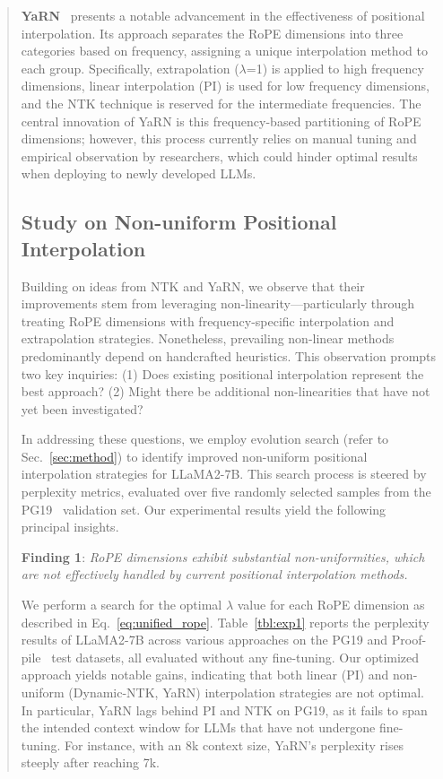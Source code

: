 \begin{abstract}
\textbf{YaRN}~\cite{yarn} presents a notable advancement in the effectiveness of positional interpolation. Its approach separates the RoPE dimensions into three categories based on frequency, assigning a unique interpolation method to each group. Specifically, extrapolation ($\lambda$=1) is applied to high frequency dimensions, linear interpolation (PI) is used for low frequency dimensions, and the NTK technique is reserved for the intermediate frequencies. The central innovation of YaRN is this frequency-based partitioning of RoPE dimensions; however, this process currently relies on manual tuning and empirical observation by researchers, which could hinder optimal results when deploying to newly developed LLMs.

\subsection{Study on Non-uniform Positional Interpolation}

Building on ideas from NTK and YaRN, we observe that their improvements stem from leveraging non-linearity—particularly through treating RoPE dimensions with frequency-specific interpolation and extrapolation strategies. Nonetheless, prevailing non-linear methods predominantly depend on handcrafted heuristics. This observation prompts two key inquiries: (1) Does existing positional interpolation represent the best approach? (2) Might there be additional non-linearities that have not yet been investigated?

In addressing these questions, we employ evolution search (refer to Sec.~\ref{sec:method}) to identify improved non-uniform positional interpolation strategies for LLaMA2-7B. This search process is steered by perplexity metrics, evaluated over five randomly selected samples from the PG19~\cite{pg19} validation set. Our experimental results yield the following principal insights.

\textbf{Finding 1}: \textit{RoPE dimensions exhibit substantial non-uniformities, which are not effectively handled by current positional interpolation methods.}

We perform a search for the optimal $\lambda$ value for each RoPE dimension as described in Eq.~\ref{eq:unified_rope}. Table~\ref{tbl:exp1} reports the perplexity results of LLaMA2-7B across various approaches on the PG19 and Proof-pile~\cite{proof-pile} test datasets, all evaluated without any fine-tuning. Our optimized approach yields notable gains, indicating that both linear (PI) and non-uniform (Dynamic-NTK, YaRN) interpolation strategies are not optimal. In particular, YaRN lags behind PI and NTK on PG19, as it fails to span the intended context window for LLMs that have not undergone fine-tuning. For instance, with an 8k context size, YaRN’s perplexity rises steeply after reaching 7k.


\end{abstract}
